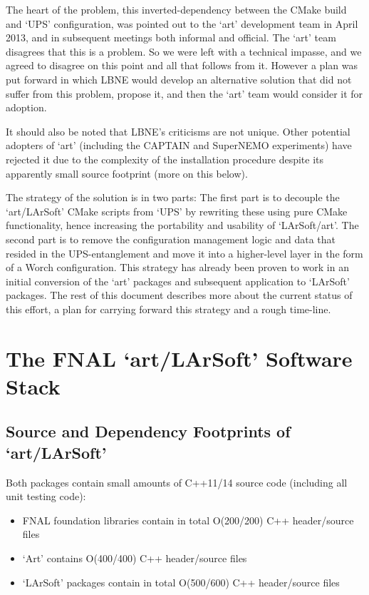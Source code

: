 \documentclass[usletter]{article}
\begin{document}
The heart of the problem, this inverted-dependency between the CMake build
and `UPS' configuration, was pointed out to the `art' development team in
April 2013, and in subsequent meetings both informal and official. The `art' team disagrees that this is a problem.
So we were left with a technical impasse, and we agreed to disagree on this point and all 
that follows from it.  However a plan was put forward in which LBNE would develop an alternative solution that did not suffer from this 
problem, propose it, and then the `art' team would consider it for adoption.

It should also be noted that LBNE's criticisms are not unique.   Other potential adopters of `art' (including
the CAPTAIN and SuperNEMO experiments) have rejected it due to the complexity
of the installation procedure despite its apparently small source footprint (more on this below).

The strategy of the solution is in two parts: The first part is to
decouple the `art/LArSoft' CMake scripts from `UPS' by rewriting these
using pure CMake functionality, hence increasing the portability and
usability of `LArSoft/art'. The second part is to remove the
configuration management logic and data that resided in the
UPS-entanglement and move it into a higher-level layer in the form of a
Worch configuration. This strategy has already been proven to work in an
initial conversion of the `art' packages and subsequent application to `LArSoft' packages.
The rest of this document describes more about the current status of this effort, a plan for
carrying forward this strategy and a rough time-line.

\section{The FNAL `art/LArSoft' Software Stack}
\subsection{Source and Dependency Footprints of `art/LArSoft'}

Both packages contain small amounts of C++11/14 source code (including all unit testing code):
\begin{itemize}

	\item FNAL foundation libraries contain in total O(200/200) C++ header/source files
	\item `Art' contains O(400/400) C++ header/source files
	\item `LArSoft' packages contain in total O(500/600) C++ header/source files

\end{itemize}
\end{document}
